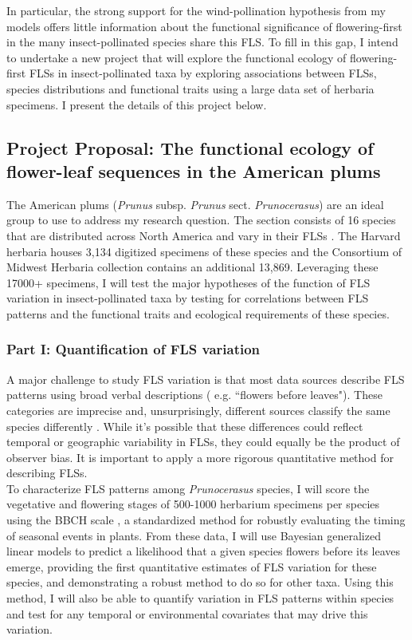 \documentclass[11pt]{article}
\begin{document}
In particular, the strong support for the wind-pollination hypothesis from my models offers little information about the functional significance of flowering-first in the many insect-pollinated species share this FLS. To fill in this gap, I intend to undertake a new project that will explore the functional ecology of flowering-first FLSs in insect-pollinated taxa by exploring associations between FLSs, species distributions and functional traits using a large data set of herbaria specimens. I present the details of this project below.

\subsection*{Project Proposal: The functional ecology of flower-leaf sequences in the American plums}
The American plums (\textit{Prunus} subsp. \textit{Prunus} sect. \textit{Prunocerasus}) are an ideal group to use to address my research question. The section consists of 16 species that are distributed across North America and vary in their FLSs \citep{Shaw:2004aa}. The Harvard herbaria houses 3,134 digitized specimens of these species and the Consortium of Midwest Herbaria collection contains an additional 13,869. Leveraging these 17000+ specimens, I will test the major hypotheses of the function of FLS variation in insect-pollinated taxa by testing for correlations between FLS patterns and the functional traits and ecological requirements of these species.
\subsubsection*{Part I: Quantification of FLS variation}
A major challenge to study FLS variation is that most data sources describe FLS patterns using broad verbal descriptions ( e.g. ``flowers before leaves"). These categories are imprecise and, unsurprisingly, different sources classify the same species differently \citep{Buonaiuto2020}. While it’s possible that these differences could reflect temporal or geographic variability in FLSs, they could equally be the product of observer bias. It is important to apply a more rigorous quantitative method for describing FLSs.\\

To characterize FLS patterns among \textit{Prunocerasus} species, I will score the vegetative and flowering stages of 500-1000 herbarium specimens per species using the BBCH scale \citep{Finn2007}, a standardized method for robustly evaluating the timing of seasonal events in plants. From these data, I will use Bayesian generalized linear models to predict a likelihood that a given species flowers before its leaves emerge, providing the first quantitative estimates of FLS variation for these species, and demonstrating a robust method to do so for other taxa. Using this method, I will also be able to quantify variation in FLS patterns within species and test for any temporal or environmental covariates that may drive this variation.
\end{document}
